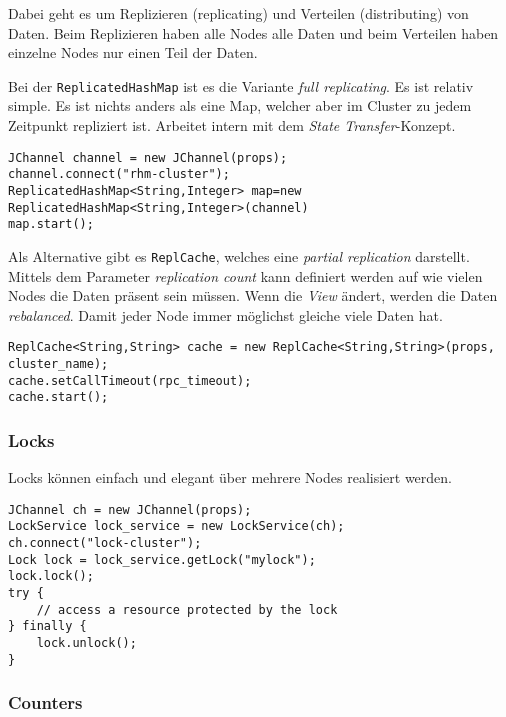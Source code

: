 Dabei geht es um Replizieren (replicating) und Verteilen (distributing) von Daten. Beim Replizieren haben alle Nodes alle Daten und beim Verteilen haben  einzelne Nodes nur einen Teil der Daten.
	
Bei der \verb|ReplicatedHashMap| ist es die Variante \emph{full replicating}. Es ist relativ simple. Es ist nichts anders als eine Map, welcher aber im Cluster zu jedem Zeitpunkt repliziert ist. Arbeitet intern mit dem \emph{State Transfer}-Konzept.
	
\begin{lstlisting}[caption=Beispiel einer \texttt{ReplicatedHashMap}]
JChannel channel = new JChannel(props);
channel.connect("rhm-cluster");
ReplicatedHashMap<String,Integer> map=new ReplicatedHashMap<String,Integer>(channel)
map.start();
\end{lstlisting}

Als Alternative gibt es \verb|ReplCache|, welches eine \emph{partial replication} darstellt. Mittels dem Parameter \emph{replication count} kann definiert werden auf wie vielen Nodes die Daten präsent sein müssen. Wenn die \emph{View} ändert, werden die Daten \emph{rebalanced}. Damit jeder Node immer möglichst gleiche viele Daten hat.
	
\begin{lstlisting}[caption=Partial Replication]
ReplCache<String,String> cache = new ReplCache<String,String>(props, cluster_name);
cache.setCallTimeout(rpc_timeout);
cache.start();
\end{lstlisting}

\subsubsection{Locks} 

Locks können einfach und elegant über mehrere Nodes realisiert werden.
	
\begin{lstlisting}[caption=Beispiel eines Locks]
JChannel ch = new JChannel(props);
LockService lock_service = new LockService(ch);
ch.connect("lock-cluster");
Lock lock = lock_service.getLock("mylock");
lock.lock();
try {
	// access a resource protected by the lock
} finally {
	lock.unlock();
}
\end{lstlisting}

\subsubsection{Counters}

